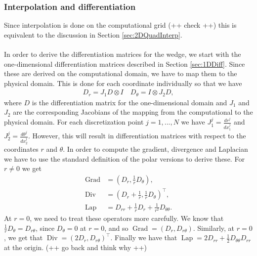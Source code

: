 \documentclass[11pt, a4paper]{article}
\theoremstyle{definition}
\DeclareMathOperator{\Grad}{Grad}
\DeclareMathOperator{\Div}{Div}
\DeclareMathOperator{\Lap}{Lap}
\begin{document}
\subsubsection{Interpolation and differentiation}
Since interpolation is done on the computational grid (++ check ++) this is equivalent to the discussion in Section \ref{sec:2DQuadInterp}.
\\
\\
In order to derive the differentiation matrices for the wedge, we start with the one-dimensional differentiation matrices described in Section \ref{sec:1DDiff}. Since these are derived on the computational domain, we have to map them to the physical domain. This is done for each coordinate individually so that we have
\begin{align*}
	D_r = J_1D \otimes I \quad 	D_\theta =I \otimes J_2D,
\end{align*} 
where $D$ is the differentiation matrix for the one-dimensional domain and $J_1$ and $J_2$  are the corresponding Jacobians of the mapping from the computational to the physical domain. For each discretization point $j = 1,...,N$ we have $ J_1^j= \frac{dr^j}{dx_1^j}$ and $J_2^j = \frac{d\theta^j}{dx_2^j}$.
However, this will result in differentiation matrices with respect to the coordinates $r$ and $\theta$. In order to compute the gradient, divergence and Laplacian we have to use the standard definition of the polar versions to derive these. For $ r \neq 0$ we get
\begin{align*}
	\Grad  &= \left(D_r, \frac{1}{r} D_\theta\right) ,\\
	\Div &= \left(D_r + \frac{1}{r}, \frac{1}{r} D_\theta\right)^\top ,\\
	\Lap  &= D_{rr} +\frac{1}{r}D_r +  \frac{1}{r^2} D_{\theta \theta}.
\end{align*}
At $ r = 0$, we need to treat these operators more carefully. We know that $\frac{1}{r} D_\theta = D_{r\theta}$, since $D_\theta =0$ at $r = 0$, and so $ \Grad = \left(D_r, D_{r\theta}\right)$. Similarly, at $r = 0$, we get that $\Div = \left(2D_r, D_{r\theta}\right)^\top$. Finally we have that $\Lap = 2 D_{rr} + \frac{1}{2} D_{\theta\theta}D_{rr}$ at the origin. (++ go back and think why ++)
\end{document}
